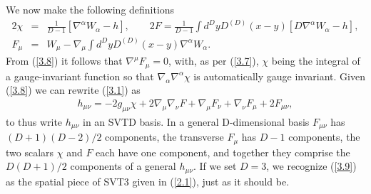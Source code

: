 \documentclass[aps,onecolumn,10pt]{revtex4}
\numberwithin{equation}{section}
\numberwithin{equation}{section}
\begin{document}
We now make the following definitions
%
\begin{eqnarray}
2\chi&=&\frac{1}{D-1}[\nabla^{\alpha}W_{\alpha}-h],\quad 
\quad 2F=\frac{1}{D-1}\int d^DyD^{(D)}(x-y)[D\nabla^{\alpha}W_{\alpha}-h],
\nonumber\\
F_{\mu}&=&W_{\mu}-\nabla_{\mu}\int d^DyD^{(D)}(x-y)\nabla^{\alpha}W_{\alpha}.
\label{3.8}
\end{eqnarray}
%
From (\ref{3.8})  it follows that  $\nabla^{\mu}F_{\mu}=0$, with, as per (\ref{3.7}),  $\chi$ being the integral of a gauge-invariant function so that $\nabla_{\alpha}\nabla^{\alpha}\chi$ is automatically gauge invariant. Given (\ref{3.8}) we can rewrite (\ref{3.1}) as 
%
\begin{eqnarray}
h_{\mu\nu}=-2g_{\mu\nu}\chi+2\nabla_{\mu}\nabla_{\nu}F
+ \nabla_{\mu}F_{\nu}+\nabla_{\nu}F_{\mu}+2F_{\mu\nu},
\label{3.9}
\end{eqnarray}
%
to thus write $h_{\mu\nu}$ in an SVTD  basis. In a general D-dimensional basis $F_{\mu\nu}$ has $(D+1)(D-2)/2$ components, the transverse $F_{\mu}$ has $D-1$ components, the two scalars $\chi$ and $F$ each have one component, and together they comprise the $D(D+1)/2$ components of a general $h_{\mu\nu}$. If we set $D=3$, we recognize (\ref{3.9}) as the spatial piece of SVT3 given in (\ref{2.1}), just as it should be.
\end{document}
